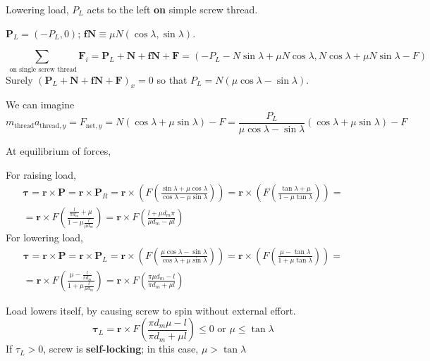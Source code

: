 \documentclass[10pt]{amsart}
\begin{document}
\begin{multicols*}{2}
Lowering load, $P_L$ acts to the left \textbf{on} simple screw thread.  

$\mathbf{P}_L = (-P_L ,0)$; $\mathbf{fN} \equiv \mu N(\cos{\lambda}, \sin{\lambda})$.  

\begin{equation}
\sum_{\text{ on single screw thread} } \mathbf{F}_i = \mathbf{P}_L + \mathbf{N} + \mathbf{fN} + \mathbf{F} = (-P_L - N\sin{\lambda} + \mu N \cos{\lambda}, N\cos{\lambda} + \mu N \sin{\lambda} - F)
\end{equation}
Surely $(\mathbf{P}_L + \mathbf{N} + \mathbf{fN} + \mathbf{F})_x =0$ so that $P_L = N(\mu \cos{\lambda} - \sin{\lambda} )$.  

We can imagine 
\[
m_{\text{thread}} a_{\text{thread},y} = F_{\text{net},y} = N(\cos{\lambda} + \mu \sin{\lambda}) - F = \frac{ P_L}{ \mu \cos{\lambda} - \sin{\lambda} } (\cos{\lambda} +\mu \sin{\lambda} ) - F
\]

At equilibrium of forces,

For raising load, 
\[
\begin{gathered}
	\mathbf{\tau} = \mathbf{r} \times \mathbf{P} = \mathbf{r} \times \mathbf{P}_R = \mathbf{r} \times \left( F \left( \frac{ \sin{ \lambda } + \mu \cos{\lambda} }{ \cos{ \lambda} - \mu \sin{\lambda}  } \right) \right) = \mathbf{r} \times \left( F \left( \frac{ \tan{ \lambda } + \mu  }{ 1 - \mu \tan{\lambda}  } \right) \right) = \\
= \mathbf{r} \times F \left( \frac{ \frac{ l}{ \pi d_m } + \mu }{ 1 - \mu \frac{l}{\mu d_m } } \right) = \mathbf{r} \times F \left( \frac{ l + \mu d_m \pi }{ \mu d_m - \mu l } \right)
\end{gathered}
\]
For lowering load, 
\[
\begin{gathered}
	\mathbf{\tau} = \mathbf{r} \times \mathbf{P} = \mathbf{r} \times \mathbf{P}_L = \mathbf{r} \times \left( F \left( \frac{  \mu \cos{ \lambda } -  \sin{\lambda} }{ \cos{ \lambda} + \mu \sin{\lambda}  } \right) \right) = \mathbf{r} \times \left( F \left(   \frac{ \mu -  \tan{ \lambda }   }{ 1 + \mu \tan{\lambda}  } \right) \right) = \\
= \mathbf{r} \times F \left( \frac{ \mu -  \frac{ l}{ \pi d_m }  }{ 1 + \mu \frac{l}{\mu d_m } } \right) = \mathbf{r} \times F \left( \frac{ \pi \mu d_m - l }{ \pi d_m + \mu l } \right)
\end{gathered}
\]

Load lowers itself, by causing screw to spin without external effort.  
\begin{equation}
	\mathbf{\tau}_L  = \mathbf{r} \times F \left( \frac{ \pi d_m \mu - l }{ \pi d_m + \mu l } \right)  \leq 0 \text{ or } \mu \leq \tan{\lambda} 
\end{equation}
If $\tau_L >0$, screw is \textbf{self-locking}; in this case, $\mu > \tan{\lambda}$


\end{multicols*}
\end{document}
